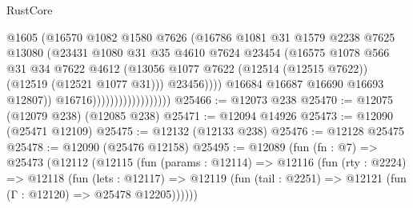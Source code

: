 \begin{lexlean}{RustCore}
\begin{coremodule}
                                            @1605
                                            (@16570
                                              @1082
                                              @1580
                                              @7626
                                              (@16786
                                                @1081
                                                @31
                                                @1579
                                                @2238
                                                @7625
                                                @13080
                                                (@23431
                                                  @1080
                                                  @31
                                                  @35
                                                  @4610
                                                  @7624
                                                  @23454
                                                  (@16575
                                                    @1078
                                                    @566
                                                    @31
                                                    @34
                                                    @7622
                                                    @4612
                                                    (@13056
                                                      @1077
                                                      @7622
                                                      (@12514 (@12515 @7622))
                                                      (@12519 (@12521 @1077 @31)))
                                                    @23456))))
                                            @16684
                                            @16687
                                            @16690
                                            @16693
                                            @12807))
                                        @16716))))))))))))))))))
@25466 := @12073 @238
@25470 := @12075 (@12079 @238) (@12085 @238)
@25471 := @12094 @14926
@25473 := @12090 (@25471 @12109)
@25475 := @12132 (@12133 @238)
@25476 := @12128 @25475
@25478 := @12090 (@25476 @12158)
@25495 := @12089
    (fun (fn : @7) =>
    @25473
      (@12112
        (@12115
          (fun (params : @12114) =>
          @12116
            (fun (rty : @2224) =>
            @12118
              (fun (lets : @12117) =>
              @12119 (fun (tail : @2251) => @12121 (fun (Γ : @12120) => @25478 @12205))))))

\end{coremodule}
\end{lexlean}
